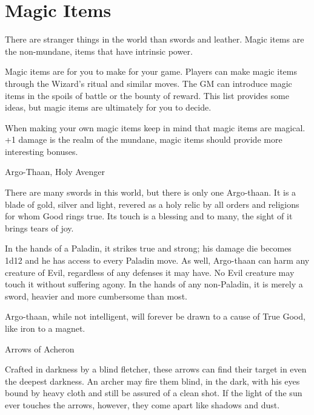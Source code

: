 \chapter{Magic Items}
   
 

There are stranger things in the world than swords and leather. Magic items are the non-mundane, items that have intrinsic power.

 

Magic items are for you to make for your game. Players can make magic items through the Wizard's ritual and similar moves. The GM can introduce magic items in the spoils of battle or the bounty of reward. This list provides some ideas, but magic items are ultimately for you to decide.

 

When making your own magic items keep in mind that magic items are magical. +1 damage is the realm of the mundane, magic items should provide more interesting bonuses.

 

Argo-Thaan, Holy Avenger	 

 

There are many swords in this world, but there is only one Argo-thaan. It is a blade of gold, silver and light, revered as a holy relic by all orders and religions for whom Good rings true. Its touch is a blessing and to many, the sight of it brings tears of joy.

 

In the hands of a Paladin, it strikes true and strong; his damage die becomes 1d12 and he has access to every Paladin move. As well, Argo-thaan can harm any creature of Evil, regardless of any defenses it may have. No Evil creature may touch it without suffering agony. In the hands of any non-Paladin, it is merely a sword, heavier and more cumbersome than most.

 

Argo-thaan, while not intelligent, will forever be drawn to a cause of True Good, like iron to a magnet.

 

Arrows of Acheron	 

 

Crafted in darkness by a blind fletcher, these arrows can find their target in even the deepest darkness. An archer may fire them blind, in the dark, with his eyes bound by heavy cloth and still be assured of a clean shot. If the light of the sun ever touches the arrows, however, they come apart like shadows and dust.

